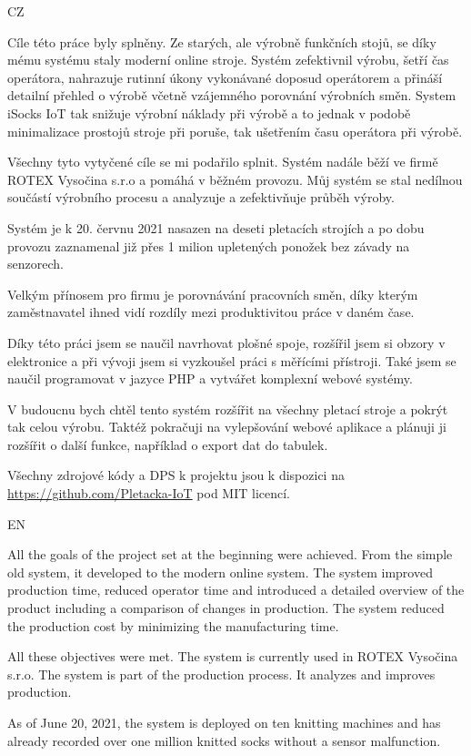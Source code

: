 \documentclass[12pt, a4paper]{article}
\begin{document}
CZ

Cíle této práce byly splněny. Ze starých, ale výrobně funkčních stojů, se díky mému systému staly moderní online stroje.
Systém zefektivnil výrobu, šetří čas operátora, nahrazuje rutinní úkony vykonávané doposud operátorem a přináší detailní přehled o výrobě včetně vzájemného porovnání výrobních směn.
System iSocks IoT tak snižuje výrobní náklady při výrobě a to jednak v podobě minimalizace prostojů stroje při poruše, tak ušetřením času operátora při výrobě.


Všechny tyto vytyčené cíle se mi podařilo splnit.
Systém nadále běží ve firmě ROTEX Vysočina s.r.o a pomáhá v běžném provozu.
Můj systém se stal nedílnou součástí výrobního procesu a analyzuje a zefektivňuje průběh výroby.

Systém je k 20. červnu 2021 nasazen na deseti pletacích strojích a po dobu provozu zaznamenal již přes 1 milion upletených ponožek bez závady na senzorech.

Velkým přínosem pro firmu je porovnávání pracovních směn, díky kterým zaměstnavatel ihned vidí rozdíly mezi produktivitou práce v daném čase.

Díky této práci jsem se naučil navrhovat plošné spoje, rozšířil jsem si obzory v elektronice a při vývoji jsem si vyzkoušel práci s měřícími přístroji.
Také jsem se naučil programovat v jazyce PHP a vytvářet komplexní webové systémy.

V budoucnu bych chtěl tento systém rozšířit na všechny pletací stroje a pokrýt tak celou výrobu.
Taktéž pokračuji na vylepšování webové aplikace a plánuji ji rozšířit o další funkce, například o export dat do tabulek.

Všechny zdrojové kódy a DPS k projektu jsou k dispozici na \url{https://github.com/Pletacka-IoT} pod MIT licencí.

EN

All the goals of the project set at the beginning were achieved. From the simple old system, it developed to the modern online system.
The system improved production time, reduced operator time and introduced a detailed overview of the product including a comparison of changes in production.
The system reduced the production cost by minimizing the manufacturing time.


All these objectives were met.
The system is currently used in ROTEX Vysočina s.r.o. The system is part of the production process. It analyzes and improves production.

As of June 20, 2021, the system is deployed on ten knitting machines and has already recorded over one million knitted socks without a sensor malfunction.
\end{document}

